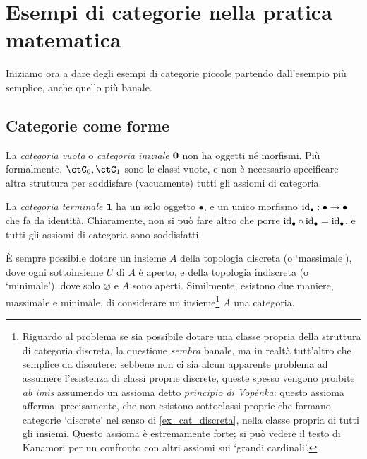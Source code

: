 \section{Esempi di categorie nella pratica matematica}\label{sec_esempi_cats}
Iniziamo ora a dare degli esempi di categorie piccole partendo dall'esempio più semplice, anche quello più banale.
\subsection{Categorie come forme}\label{ssec:categorie_forme}
\begin{example}\label{ex_cat_vuota}
	La \emph{categoria vuota} o \emph{categoria iniziale} \(\mathbf{0}\) non ha oggetti né morfismi. Più formalmente, \(\ctC_0,\ctC_1\) sono le classi vuote, e non è necessario specificare altra struttura per soddisfare (vacuamente) tutti gli assiomi di categoria.
\end{example}
\begin{example}\label{ex_cat_term}
	La \emph{categoria terminale} \(\mathbf{1}\) ha un solo oggetto \(\bullet\), e un unico morfismo \(\mathrm{id}_\bullet : \bullet\to\bullet\) che fa da identità. Chiaramente, non si può fare altro che porre \(\mathrm{id}_\bullet\circ\mathrm{id}_\bullet=\mathrm{id}_\bullet\), e tutti gli assiomi di categoria sono soddisfatti.
\end{example}
\`E sempre possibile dotare un insieme \(A\) della topologia discreta (o `massimale'), dove ogni sottoinsieme \(U\) di \(A\) è aperto, e della topologia indiscreta (o `minimale'), dove solo \(\varnothing\) e \(A\) sono aperti. Similmente, esistono due maniere, massimale e minimale, di considerare un insieme\footnote{Riguardo al problema se sia possibile dotare una classe propria della struttura di categoria discreta, la questione \emph{sembra} banale, ma in realtà tutt'altro che semplice da discutere: sebbene non ci sia alcun apparente problema ad assumere l'esistenza di classi proprie discrete, queste spesso vengono proibite \emph{ab imis} assumendo un assioma detto \emph{principio di Vop\v enka}: questo assioma afferma, precisamente, che non esistono sottoclassi proprie che formano categorie `discrete' nel senso di \ref{ex_cat_discreta}, nella classe propria di tutti gli insiemi. Questo assioma è estremamente forte; si può vedere il testo di Kanamori \cite{} per un confronto con altri assiomi sui `grandi cardinali'.} \(A\) una categoria.
